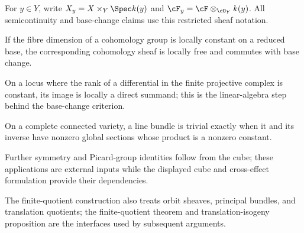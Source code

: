 \begin{remark}
\label{ch02-sec05-fiber-notation}
For $y\in Y$, write $X_y=X\times_Y\Spec k(y)$ and
$\cF_y=\cF\otimes_{\cO_Y}k(y)$.  All semicontinuity and base-change claims
use this restricted sheaf notation.
\notready
\end{remark}

\begin{lemma}
\label{ch02-sec05-constant-fiber-lemma}
If the fibre dimension of a cohomology group is locally constant on a reduced
base, the corresponding cohomology sheaf is locally free and commutes with
base change.
\notready
\end{lemma}

\begin{lemma}
\label{ch02-sec05-image-splitting-lemma}
On a locus where the rank of a differential in the finite projective complex is
constant, its image is locally a direct summand; this is the linear-algebra
step behind the base-change criterion.
\notready
\end{lemma}

\begin{lemma}
\label{ch02-sec05-trivial-line-bundle-criterion}
On a complete connected variety, a line bundle is trivial exactly when it and
its inverse have nonzero global sections whose product is a nonzero constant.
\notready
\end{lemma}

\begin{remark}
\label{ch02-sec06-unread-proof}
Further symmetry and Picard-group identities follow from the cube; these
applications are external inputs while the displayed cube and
cross-effect formulation provide their dependencies.
\notready
\end{remark}

\begin{remark}
\label{ch02-sec07-coverage}
The finite-quotient construction also treats orbit sheaves, principal bundles,
and translation quotients; the finite-quotient theorem and translation-isogeny
proposition are the interfaces used by subsequent arguments.
\notready
\end{remark}

